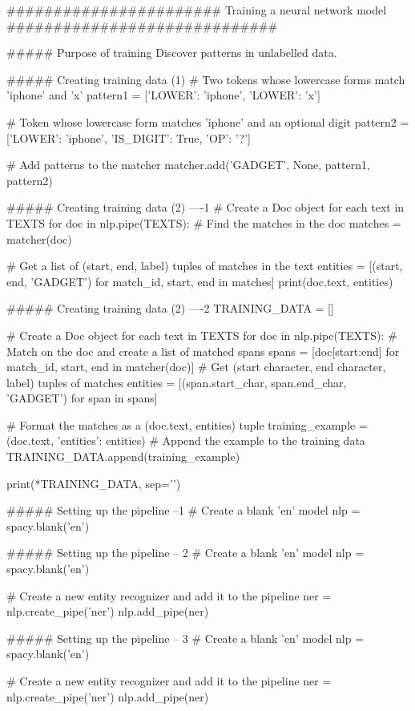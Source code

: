 #######################   Training a neural network model  #############################

##### Purpose of training
Discover patterns in unlabelled data.


##### Creating training data (1)
# Two tokens whose lowercase forms match 'iphone' and 'x'
pattern1 = [{'LOWER': 'iphone'}, {'LOWER': 'x'}]

# Token whose lowercase form matches 'iphone' and an optional digit
pattern2 = [{'LOWER': 'iphone'}, {'IS_DIGIT': True, 'OP': '?'}]

# Add patterns to the matcher
matcher.add('GADGET', None, pattern1, pattern2)


##### Creating training data (2)   ----1
# Create a Doc object for each text in TEXTS
for doc in nlp.pipe(TEXTS):
    # Find the matches in the doc
    matches = matcher(doc)
    
    # Get a list of (start, end, label) tuples of matches in the text
    entities = [(start, end, 'GADGET') for match_id, start, end in matches]
    print(doc.text, entities)    


##### Creating training data (2)   ----2
TRAINING_DATA = []

# Create a Doc object for each text in TEXTS
for doc in nlp.pipe(TEXTS):
    # Match on the doc and create a list of matched spans
    spans = [doc[start:end] for match_id, start, end in matcher(doc)]
    # Get (start character, end character, label) tuples of matches
    entities = [(span.start_char, span.end_char, 'GADGET') for span in spans]
    
    # Format the matches as a (doc.text, entities) tuple
    training_example = (doc.text, {'entities': entities})
    # Append the example to the training data
    TRAINING_DATA.append(training_example)
    
print(*TRAINING_DATA, sep='\n')    



##### Setting up the pipeline --1
# Create a blank 'en' model
nlp = spacy.blank('en')


##### Setting up the pipeline -- 2
# Create a blank 'en' model
nlp = spacy.blank('en')

# Create a new entity recognizer and add it to the pipeline
ner = nlp.create_pipe('ner')
nlp.add_pipe(ner)


##### Setting up the pipeline  -- 3
# Create a blank 'en' model
nlp = spacy.blank('en')

# Create a new entity recognizer and add it to the pipeline
ner = nlp.create_pipe('ner')
nlp.add_pipe(ner)


